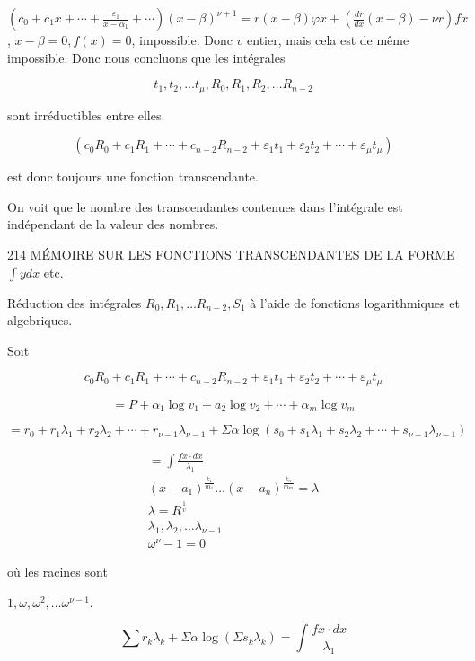 \documentclass{article}
\begin{document}
\(\left(c_{0}+c_{1} x+\cdots+\frac{\varepsilon_{1}}{x-\alpha_{1}}+\cdots\right)(x-\beta)^{\nu+1}=r(x-\beta) \varphi x+\left(\frac{d r}{d x}(x-\beta)-\nu r\right) f x\), \(x-\beta=0, f(x)=0\), impossible. Donc \(v\) entier, mais cela est de même impossible. Donc nous concluons que les intégrales

\[
t_{1}, t_{2}, \ldots t_{\mu}, R_{0}, R_{1}, R_{2}, \ldots R_{n-2}
\]

sont irréductibles entre elles.

\[
\left(c_{0} R_{0}+c_{1} R_{1}+\cdots+c_{n-2} R_{n-2}+\varepsilon_{1} t_{1}+\varepsilon_{2} t_{2}+\cdots+\varepsilon_{\mu} t_{\mu}\right)
\]

est donc toujours une fonction transcendante.

On voit que le nombre des transcendantes contenues dans l'intégrale est indépendant de la valeur des nombres.

214 MÉMOIRE SUR LES FONCTIONS TRANSCENDANTES DE I.A FORME \(\int y d x\) etc.

Réduction des intégrales \(R_{0}, R_{1}, \ldots R_{n-2}, S_{1}\) à l'aide de fonctions logarithmiques et algebriques.

Soit

\[
c_{0} R_{0}+c_{1} R_{1}+\cdots+c_{n-2} R_{n-2}+\varepsilon_{1} t_{1}+\varepsilon_{2} t_{2}+\cdots+\varepsilon_{\mu} t_{\mu}
\]

\[
=P+\alpha_{1} \log v_{1}+a_{2} \log v_{2}+\cdots+\alpha_{m} \log v_{m}
\]

\(=r_{0}+r_{1} \lambda_{1}+r_{2} \lambda_{2}+\cdots+r_{\nu-1} \lambda_{\nu-1}+\Sigma \alpha \log \left(s_{0}+s_{1} \lambda_{1}+s_{2} \lambda_{2}+\cdots+s_{\nu-1} \lambda_{\nu-1}\right)\)

\[
\begin{gathered}
=\int \frac{f x \cdot d x}{\lambda_{1}} \\
\left(x-a_{1}\right)^{\frac{k_{1}}{m_{1}}} \ldots\left(x-a_{n}\right)^{\frac{k_{n}}{m_{m}}}=\lambda \\
\lambda=R^{\frac{1}{v}} \\
\lambda_{1}, \lambda_{2}, \ldots \lambda_{\nu-1} \\
\omega^{\nu}-1=0
\end{gathered}
\]

où les racines sont

\(1, \omega, \omega^{2}, \ldots \omega^{\nu-1}\).

\[
\sum r_{k} \lambda_{k}+\Sigma \alpha \log \left(\Sigma s_{k} \lambda_{k}\right)=\int \frac{f x \cdot d x}{\lambda_{1}}
\]
\end{document}
